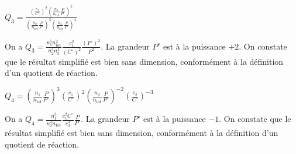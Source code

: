 \begin{enonce}
$Q_3= 
\frac{\displaystyle\left(\frac{c_1}{C^\circ}\right)^2 \left(\frac{n_1}{n_\mathrm{tot}} \frac{P}{P^{\circ}}\right)^5}
{\displaystyle\left(\frac{n_2}{n_\mathrm{tot}} \frac{P}{P^{\circ}}\right)^3 \left(\frac{n_3}{n_\mathrm{tot}} \frac{P}{P^{\circ}}\right)^4}$
\end{enonce}


\begin{corrige}
On a $Q_3=\frac{n_1^5 n_\mathrm{tot}^2}{n_2^3 n_3^4} \frac{c_1^2}{(C^\circ)^2} \frac{(P^{\circ})^2}{P^2}$. La grandeur $P^{\circ}$ est à la puissance $+2$. On constate que le résultat simplifié est bien sans dimension, conformément à la définition d'un quotient de réaction.
\end{corrige}



\begin{enonce}
$Q_4= \left(\frac{n_1}{n_\mathrm{tot}} \frac{P}{P^{\circ}}\right)^3 \left(\frac{c_1}{C^\circ}\right)^2 \left(\frac{n_2}{n_\mathrm{tot}} \frac{P}{P^{\circ}}\right)^{-2} \left(\frac{c_2}{C^\circ}\right)^{-3}$
\end{enonce}


\begin{corrige}
On a $Q_4=\frac{n_1^3 }{n_2^2 n_\mathrm{tot}} \frac{c_1^2 C^\circ}{c_2^3} \frac{P}{P^{\circ}}$. La grandeur $P^{\circ}$ est à la puissance $-1$. On constate que le résultat simplifié est bien sans dimension, conformément à la définition d'un quotient de réaction.
\end{corrige}


\finEntrainement






